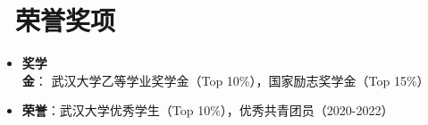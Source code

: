\documentclass{resume}
\begin{document}


\vspace{-3mm}
\section{\faTrophy\ 荣誉奖项}
\begin{itemize}[parsep=0.5ex]
  \item \textbf{奖学金}： 武汉大学乙等学业奖学金（Top 10\%），国家励志奖学金（Top 15\%）
  \item \textbf{荣誉}：武汉大学优秀学生（Top 10\%），优秀共青团员（2020-2022）
\end{itemize}

%
%
\end{document}
